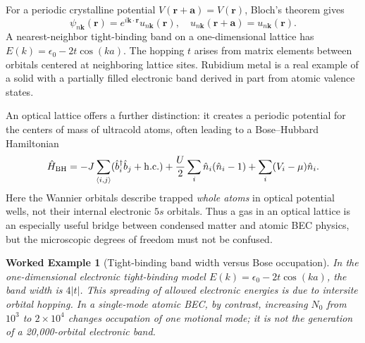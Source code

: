\documentclass[11pt,a4paper]{article}
\newtheorem{example}{Worked Example}
\begin{document}
For a periodic crystalline potential $V(\mathbf r+\mathbf a)=V(\mathbf r)$, Bloch's theorem gives
\begin{equation}
\psi_{n\mathbf k}(\mathbf r)=e^{i\mathbf k\cdot\mathbf r}u_{n\mathbf k}(\mathbf r),\quad u_{n\mathbf k}(\mathbf r+\mathbf a)=u_{n\mathbf k}(\mathbf r).
\end{equation}
A nearest-neighbor tight-binding band on a one-dimensional lattice has $E(k)=\epsilon_0-2t\cos(ka)$. The hopping $t$ arises from matrix elements between orbitals centered at neighboring lattice sites. Rubidium metal is a real example of a solid with a partially filled electronic band derived in part from atomic valence states.

\begin{center}
\end{center}

An optical lattice offers a further distinction: it creates a periodic potential for the centers of mass of ultracold atoms, often leading to a Bose--Hubbard Hamiltonian
\begin{equation}
\hat H_{\rm BH}=-J\sum_{\langle i,j\rangle}(\hat b_i^\dagger\hat b_j+\mathrm{h.c.})+\frac U2\sum_i\hat n_i(\hat n_i-1)+\sum_i(V_i-\mu)\hat n_i.
\end{equation}
Here the Wannier orbitals describe trapped \emph{whole atoms} in optical potential wells, not their internal electronic $5s$ orbitals. Thus a gas in an optical lattice is an especially useful bridge between condensed matter and atomic BEC physics, but the microscopic degrees of freedom must not be confused.

\begin{example}[Tight-binding band width versus Bose occupation]
In the one-dimensional electronic tight-binding model $E(k)=\epsilon_0-2t\cos(ka)$, the band width is $4|t|$. This spreading of allowed \emph{electronic} energies is due to intersite orbital hopping. In a single-mode atomic BEC, by contrast, increasing $N_0$ from $10^3$ to $2\times10^4$ changes occupation of one \emph{motional} mode; it is not the generation of a 20,000-orbital electronic band.
\end{example}
\end{document}
